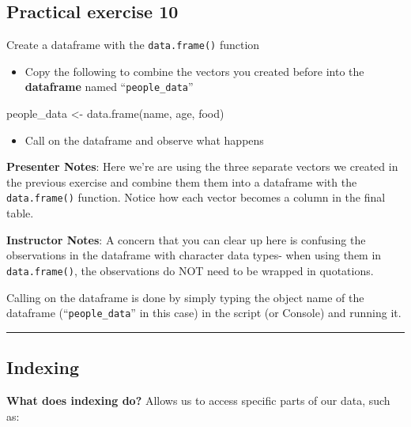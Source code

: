 \documentclass[
  letterpaper,
  DIV=11,
  numbers=noendperiod]{scrartcl}
\newenvironment{Shaded}{\begin{snugshade}}{\end{snugshade}}
\newcommand{\FunctionTok}[1]{\textcolor[rgb]{0.28,0.35,0.67}{#1}}
\newcommand{\NormalTok}[1]{\textcolor[rgb]{0.00,0.23,0.31}{#1}}
\newcommand{\OtherTok}[1]{\textcolor[rgb]{0.00,0.23,0.31}{#1}}
\providecommand{\tightlist}{%
  \setlength{\itemsep}{0pt}\setlength{\parskip}{0pt}}
\begin{document}
\subsection{Practical exercise 10}\label{practical-exercise-10}

Create a dataframe with the \texttt{data.frame()} function

\begin{itemize}
\tightlist
\item[$\square$]
  Copy the following to combine the vectors you created before into the
  \textbf{dataframe} named ``\texttt{people\_data}''
\end{itemize}

\begin{Shaded}
\begin{Highlighting}[]
\NormalTok{people\_data }\OtherTok{\textless{}{-}} \FunctionTok{data.frame}\NormalTok{(name, age, food)}
\end{Highlighting}
\end{Shaded}

\begin{itemize}
\tightlist
\item[$\square$]
  Call on the dataframe and observe what happens
\end{itemize}

\textbf{Presenter Notes}: Here we're are using the three separate
vectors we created in the previous exercise and combine them them into a
dataframe with the \texttt{data.frame()} function. Notice how each
vector becomes a column in the final table.

\textbf{Instructor Notes}: A concern that you can clear up here is
confusing the observations in the dataframe with character data types-
when using them in \texttt{data.frame()}, the observations do NOT need
to be wrapped in quotations.

Calling on the dataframe is done by simply typing the object name of the
dataframe (``\texttt{people\_data}'' in this case) in the script (or
Console) and running it.

\begin{center}\rule{0.5\linewidth}{0.5pt}\end{center}

\subsection{Indexing}\label{indexing}

\textbf{What does indexing do?} Allows us to access specific parts of
our data, such as:
\end{document}
